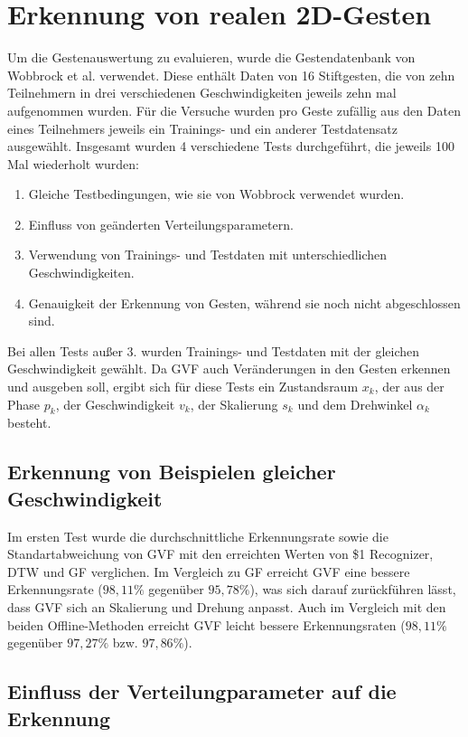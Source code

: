 \documentclass{llncs}
\begin{document}
\section{Erkennung von realen 2D-Gesten}
Um die Gestenauswertung zu evaluieren, wurde die Gestendatenbank von Wobbrock et al.\cite{Wobbrock2007} verwendet. Diese enthält Daten von 16 Stiftgesten, die von zehn Teilnehmern in drei verschiedenen Geschwindigkeiten jeweils zehn mal aufgenommen wurden. Für die Versuche wurden pro Geste zufällig aus den Daten eines Teilnehmers jeweils ein Trainings- und ein anderer Testdatensatz ausgewählt. Insgesamt wurden 4 verschiedene Tests durchgeführt, die jeweils 100 Mal wiederholt wurden:
\begin{enumerate}
\item Gleiche Testbedingungen, wie sie von Wobbrock\cite{Wobbrock2007} verwendet wurden.
\item Einfluss von geänderten Verteilungsparametern.
\item Verwendung von Trainings- und Testdaten mit unterschiedlichen Geschwindigkeiten.
\item Genauigkeit der Erkennung von Gesten, während sie noch nicht abgeschlossen sind.
\end{enumerate}
Bei allen Tests außer 3. wurden Trainings- und Testdaten mit der gleichen Geschwindigkeit gewählt.
Da GVF auch Veränderungen in den Gesten erkennen und ausgeben soll, ergibt sich für diese Tests ein Zustandsraum $x_k$, der aus der Phase $p_k$, der Geschwindigkeit $v_k$, der Skalierung $s_k$ und dem Drehwinkel $\alpha_k$ besteht.

\subsection{Erkennung von Beispielen gleicher Geschwindigkeit}
Im ersten Test wurde die durchschnittliche Erkennungsrate sowie die Standartabweichung von GVF mit den erreichten Werten von \$1 Recognizer\cite{Wobbrock2007}, DTW und GF verglichen. 
Im Vergleich zu GF erreicht GVF eine bessere Erkennungsrate ($98,11 \%$ gegenüber $95,78\%$), was sich darauf zurückführen lässt, dass GVF sich an Skalierung und Drehung anpasst.
Auch im Vergleich mit den beiden Offline-Methoden erreicht GVF leicht bessere Erkennungsraten ($98,11\%$ gegenüber $97,27\%$ bzw. $97,86\%$).

\subsection{Einfluss der Verteilungparameter auf die Erkennung}
\end{document}
